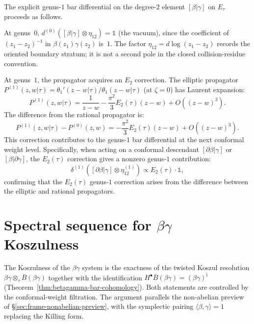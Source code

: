 \begin{computation}
\label{comp:betagamma-genus1-bar-deg2}
The explicit genus-$1$ bar differential on the degree-$2$ element
$[\beta|\gamma]$ on $E_\tau$ proceeds as follows.

At genus~$0$, $d^{(0)}([\beta|\gamma] \otimes \eta_{12}) = \mathbb{1}$
(the vacuum), since the coefficient of $(z_1-z_2)^{-1}$ in
$\beta(z_1)\gamma(z_2)$ is~$1$. The factor
$\eta_{12}=d\log(z_1-z_2)$ records the oriented boundary stratum; it
is not a second pole in the closed collision-residue convention.

At genus~$1$, the propagator acquires an $E_2$ correction.
The elliptic propagator
$P^{(1)}(z,w|\tau) = \theta_1'(z-w|\tau)/\theta_1(z-w|\tau)$
(at $\zeta = 0$) has Laurent expansion:
\[
P^{(1)}(z,w|\tau)
= \frac{1}{z-w} - \frac{\pi^2}{3} E_2(\tau)(z-w) + O((z-w)^3).
\]
The difference from the rational propagator is:
\begin{equation}\label{eq:propagator-difference}
P^{(1)}(z,w|\tau) - P^{(0)}(z,w)
= -\frac{\pi^2}{3} E_2(\tau)(z-w) + O((z-w)^3).
\end{equation}
This correction contributes to the genus-$1$ bar differential at
the next conformal weight level. Specifically, when acting on a
conformal descendant $[\partial\beta|\gamma]$ or $[\beta|\partial\gamma]$,
the $E_2(\tau)$ correction gives a nonzero genus-$1$ contribution:
\[
\delta^{(1)}([\partial\beta|\gamma] \otimes \eta_{12}^{(1)})
\propto E_2(\tau) \cdot \mathbb{1},
\]
confirming that the $E_2(\tau)$ genus-$1$ correction arises from
the difference between the elliptic and rational propagators.
\end{computation}


\section{Spectral sequence for \texorpdfstring{$\beta\gamma$}{beta-gamma}
Koszulness}
\label{sec:betagamma-spectral-sequence}

The Koszulness of the $\beta\gamma$ system is the exactness of the
twisted Koszul resolution
$\beta\gamma\otimes_{\tau}\bar B(\beta\gamma)$ together with the
identification
$H^\bullet\bar B(\beta\gamma)=(\beta\gamma)^{\mathrm i}$
(Theorem~\ref{thm:betagamma-bar-cohomology}). Both statements are
controlled by the conformal-weight filtration. The argument parallels
the non-abelian preview of \S\ref{sec:frame-nonabelian-preview}, with
the symplectic pairing $\langle \beta, \gamma \rangle = 1$ replacing
the Killing form.

